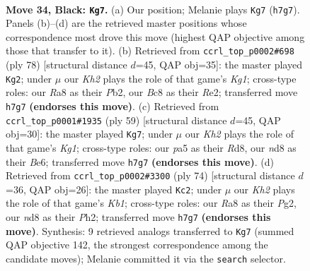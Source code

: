 \documentclass[11pt]{article}
\begin{document}
\clearpage

\begin{figure}[p]\centering
\begin{subfigure}{0.46\textwidth}\centering
\resizebox{\linewidth}{!}{%
\newchessgame
\chessboard[
  setfen={r1bN4/p6k/n1P1p3/P2p4/1P6/2P5/5K2/R1B5 b - - 0 34},
  showmover=false,
  pgfstyle=straightmove, color=movearrow, markmove={h7-g7}
]}
\caption{}
\end{subfigure}\hfill
\begin{subfigure}{0.46\textwidth}\centering
\resizebox{\linewidth}{!}{%
\newchessgame
\chessboard[
  setfen={3r2k1/2p2p2/p5pp/4N3/1n2PP2/6PP/1P2R3/6K1 w - - 0 40},
  showmover=false,
  pgfstyle=straightmove, color=movearrow, markmove={g1-g2}
]}
\caption{}
\end{subfigure}
\\[4pt]
\begin{subfigure}{0.46\textwidth}\centering
\resizebox{\linewidth}{!}{%
\newchessgame
\chessboard[
  setfen={3r2k1/5p2/4b1pp/8/6P1/R3P2P/2B2P2/6K1 b - - 0 30},
  showmover=false,
  pgfstyle=straightmove, color=movearrow, markmove={g8-g7}
]}
\caption{}
\end{subfigure}\hfill
\begin{subfigure}{0.46\textwidth}\centering
\resizebox{\linewidth}{!}{%
\newchessgame
\chessboard[
  setfen={2r5/3n1k1p/2p2bp1/1p6/1N2R3/1P6/P2B2PP/1K6 w - - 7 38},
  showmover=false,
  pgfstyle=straightmove, color=movearrow, markmove={b1-c2}
]}
\caption{}
\end{subfigure}
\caption{\textbf{Move 34, Black: \texttt{Kg7}.} (a) Our position; Melanie plays \texttt{Kg7} (\texttt{h7g7}). Panels (b)--(d) are the retrieved master positions whose correspondence most drove this move (highest QAP objective among those that transfer to it). (b) Retrieved from \texttt{ccrl\_top\_p0002\#698} (ply 78) [structural distance $d$=45, QAP obj=35]: the master played \texttt{Kg2}; under $\mu$ our \emph{Kh2} plays the role of that game's \emph{Kg1}; cross-type roles: our \emph{R}a8 as their \emph{P}b2, our \emph{B}c8 as their \emph{R}e2; transferred move \texttt{h7g7} \textbf{(endorses this move)}. (c) Retrieved from \texttt{ccrl\_top\_p0001\#1935} (ply 59) [structural distance $d$=45, QAP obj=30]: the master played \texttt{Kg7}; under $\mu$ our \emph{Kh2} plays the role of that game's \emph{Kg1}; cross-type roles: our \emph{p}a5 as their \emph{R}d8, our \emph{n}d8 as their \emph{B}e6; transferred move \texttt{h7g7} \textbf{(endorses this move)}. (d) Retrieved from \texttt{ccrl\_top\_p0002\#3300} (ply 74) [structural distance $d$=36, QAP obj=26]: the master played \texttt{Kc2}; under $\mu$ our \emph{Kh2} plays the role of that game's \emph{Kb1}; cross-type roles: our \emph{R}a8 as their \emph{P}g2, our \emph{n}d8 as their \emph{P}h2; transferred move \texttt{h7g7} \textbf{(endorses this move)}. Synthesis: 9 retrieved analogs transferred to \texttt{Kg7} (summed QAP objective 142, the strongest correspondence among the candidate moves); Melanie committed it via the \texttt{search} selector.}
\label{fig:thought-m67}
\end{figure}
\end{document}
